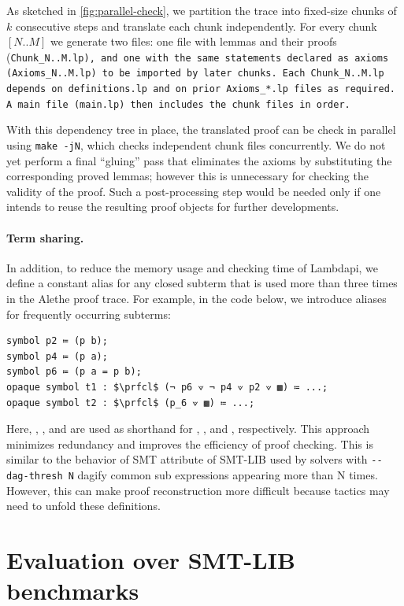 As sketched in \cref{fig:parallel-check}, we partition the trace into fixed-size chunks of $k$ consecutive steps and translate each chunk independently.
For every chunk $[N..M]$ we generate two files: one file with lemmas and their proofs (\tt{Chunk\_N..M.lp}), and one with the same statements declared as axioms (\tt{Axioms\_N..M.lp}) to be imported by later chunks.
Each \tt{Chunk\_N..M.lp} depends on \tt{definitions.lp} and on prior \tt{Axioms\_*.lp} files as required.
A main file (\tt{main.lp}) then includes the chunk files in order.

With this dependency tree in place, the translated proof can be check in parallel using \texttt{make -jN}, which checks independent chunk files concurrently.
We do not yet perform a final ``gluing'' pass that eliminates the axioms by substituting the corresponding proved lemmas; however this is unnecessary for checking the validity of the proof.
Such a post-processing step would be needed only if one intends to reuse the resulting proof objects for further developments.

\paragraph{Term sharing.}
In addition, to reduce the memory usage and checking time of Lambdapi, we define a constant alias for any closed subterm that is used more than three times in the Alethe proof trace.
For example, in the code below, we introduce aliases for frequently occurring subterms: 
\begin{lstlisting}[language=Lambdapi, mathescape=true]
symbol p2 ≔ (p b);
symbol p4 ≔ (p a);
symbol p6 ≔ (p a = p b);
opaque symbol t1 : $\prfcl$ (¬ p6 ⟇ ¬ p4 ⟇ p2 ⟇ ▩) ≔ ...;
opaque symbol t2 : $\prfcl$ (p_6 ⟇ ▩) ≔ ...;
\end{lstlisting}
Here, , , and  are used as shorthand for , , and , respectively. This approach minimizes redundancy and improves the efficiency of proof checking.
This is similar to the behavior of SMT  attribute of SMT-LIB used by solvers with \lstinline|--dag-thresh N| dagify common sub expressions appearing more than N times.
However, this can make proof reconstruction more difficult because  tactics may need to unfold these definitions.


\section{Evaluation over SMT-LIB benchmarks}
\label{sect:evaluation-smtlib}

